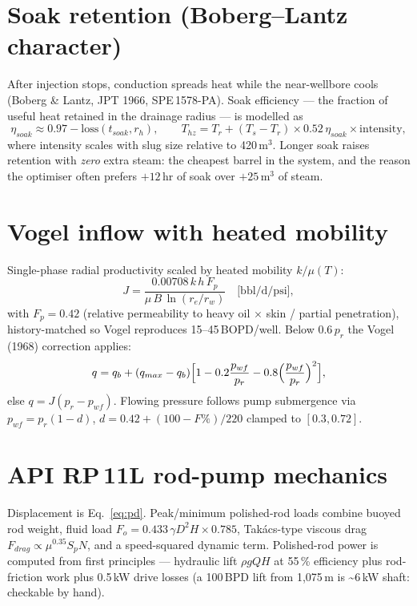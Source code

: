 \documentclass[12pt,a4paper]{report}
\begin{document}
\section{Soak retention (Boberg--Lantz character)}
After injection stops, conduction spreads heat while the near-wellbore cools
(Boberg \& Lantz, JPT 1966, SPE\,1578-PA). Soak efficiency --- the fraction of
useful heat retained in the drainage radius --- is modelled as
\begin{equation}
\eta_{soak}\approx0.97-\mathrm{loss}(t_{soak},r_h),\qquad
T_{hz}=T_r+(T_s-T_r)\times0.52\,\eta_{soak}\times\mathrm{intensity},
\label{eq:soak}
\end{equation}
where intensity scales with slug size relative to 420\,m$^3$. Longer soak
raises retention with \emph{zero} extra steam: the cheapest barrel in the
system, and the reason the optimiser often prefers $+12$\,hr of soak over
$+25$\,m$^3$ of steam.

\section{Vogel inflow with heated mobility}
Single-phase radial productivity scaled by heated mobility $k/\mu(T)$:
\begin{equation}
J=\frac{0.00708\,k\,h\,F_p}{\mu\,B\,\ln(r_e/r_w)}
\quad\text{[bbl/d/psi]},
\label{eq:j}
\end{equation}
with $F_p=0.42$ (relative permeability to heavy oil $\times$ skin / partial
penetration), history-matched so Vogel reproduces 15--45\,BOPD/well.
Below $0.6\,p_r$ the Vogel (1968) correction applies:
\begin{equation}
q=q_b+(q_{max}-q_b)\Bigl[1-0.2\frac{p_{wf}}{p_r}
-0.8\Bigl(\frac{p_{wf}}{p_r}\Bigr)^{2}\Bigr],
\label{eq:vogel}
\end{equation}
else $q=J(p_r-p_{wf})$. Flowing pressure follows pump submergence via
$p_{wf}=p_r(1-d)$, $d=0.42+(100-F\%)/220$ clamped to $[0.3,0.72]$.

\section{API RP\,11L rod-pump mechanics}
Displacement is Eq.~\ref{eq:pd}. Peak/minimum polished-rod loads combine buoyed
rod weight, fluid load $F_o=0.433\,\gamma D^{2}H\times0.785$, Tak\'acs-type
viscous drag $F_{drag}\propto\mu^{0.35}S_pN$, and a speed-squared dynamic term.
Polished-rod power is computed from first principles --- hydraulic lift
$\rho gQH$ at 55\,\% efficiency plus rod-friction work plus 0.5\,kW drive
losses (a 100\,BPD lift from 1,075\,m is \textasciitilde6\,kW shaft: checkable
by hand).
\end{document}
